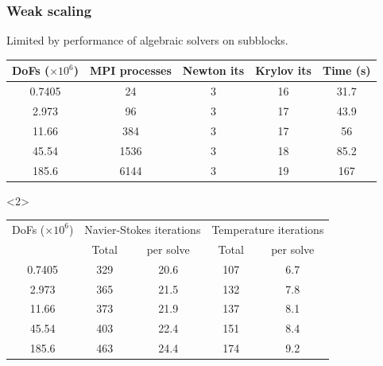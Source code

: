 \documentclass[presentation,aspectratio=43]{beamer}
\begin{document}
\begin{frame}
  \frametitle{Weak scaling}
  Limited by performance of algebraic solvers on subblocks.
  \begin{center}
    \scriptsize
  \begin{tabular}{c|c|c|c|c}
DoFs ($\times 10^{6}$) & MPI processes & Newton its & Krylov its & Time (s)\\
\hline
0.7405 & 24 & 3 & 16 & 31.7\\
2.973 & 96 & 3 & 17 & 43.9\\
11.66 & 384 & 3 & 17 & 56\\
45.54 & 1536 & 3 & 18 & 85.2\\
185.6 & 6144 & 3 & 19 & 167\\
  \end{tabular}

  \begin{uncoverenv}<2>
  \begin{tabular}{c|c|c|c|c}
    DoFs ($\times 10^{6}$) & \multicolumn{2}{|c|}{Navier-Stokes iterations} & \multicolumn{2}{|c}{Temperature iterations}\\
    & Total & per solve & Total & per solve\\
\hline
0.7405 & 329 & 20.6 & 107 & 6.7 \\
2.973  & 365 & 21.5 & 132 & 7.8 \\
11.66  & 373 & 21.9 & 137 & 8.1 \\
45.54  & 403 & 22.4 & 151 & 8.4 \\
185.6  & 463 & 24.4 & 174 & 9.2 \\
  \end{tabular}
\end{uncoverenv}
  \end{center}
\end{frame}
\end{document}
